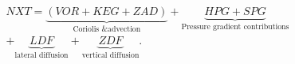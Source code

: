 \begin{equation}
\begin{split}
    NXT = \underbrace{(VOR+KEG+ZAD)}_\text{Coriolis \& advection} + \underbrace{HPG+SPG}_\text{Pressure gradient contributions} \\
    +\underbrace{LDF}_\text{lateral diffusion} +\underbrace{ZDF}_\text{vertical diffusion}.
\end{split}
\label{EQN:NEMOPrognostic}
\end{equation}
